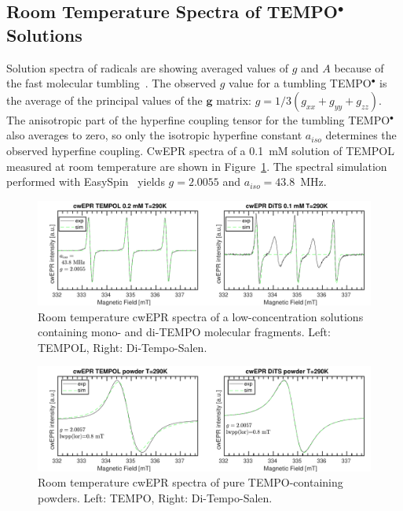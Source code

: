 \subsection{Room Temperature Spectra of TEMPO$^{\bullet}$ Solutions}
Solution spectra of radicals are showing averaged values of $g$ and $A$ because of the fast molecular tumbling~\cite{Liu_2008,Carrington_solution_epr}. The observed $g$ value for a tumbling TEMPO$^{\bullet}$ is the average of the principal values of the $\textbf{g}$ matrix: $g = 1/3\left(g_{xx}+g_{yy}+g_{zz}\right)$. The anisotropic part of the hyperfine coupling tensor for the tumbling TEMPO$^{\bullet}$ also averages to zero, so only the isotropic hyperfine constant $a_{iso}$ determines the observed hyperfine coupling. CwEPR spectra of a 0.1~mM solution of TEMPOL measured at room temperature are shown in Figure~\ref{fig:cwEPR_monoTEMPO_diTEMPO_SOLUTION}. The spectral simulation performed with EasySpin~\cite{Stoll2006} yields $g=2.0055$ and $a_{iso}=43.8$~MHz.

\begin{figure}[h]
\center
	\includegraphics[width=1\textwidth]{./operando_epr/figures/TEMPOL/cwEPR_TEMPOL_vs_DiTS_RT.pdf}
	\caption{Room temperature cwEPR spectra of a low-concentration solutions containing mono- and di-TEMPO molecular fragments. Left: TEMPOL, Right: Di-Tempo-Salen.}
	\label{fig:cwEPR_monoTEMPO_diTEMPO_SOLUTION}
\end{figure}
\begin{figure}[h]
\center
	\includegraphics[width=1\textwidth]{./operando_epr/figures/TEMPOL/cwEPR_TEMPOL_vs_DiTS_RT_POWDER.pdf}
	\caption{Room temperature cwEPR spectra of pure TEMPO-containing powders. Left: TEMPO, Right: Di-Tempo-Salen.}
	\label{fig:cwEPR_monoTEMPO_diTEMPO_POWDER}
\end{figure}

